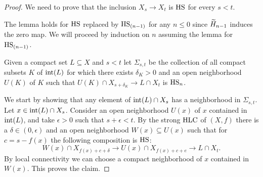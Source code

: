 \begin{proof}
	We need to prove that the inclusion $X_s \to X_t$ is $\mathrm{HS}$ for every $s < t$.
	
	The lemma holds for $\mathrm{HS}$ replaced by $\mathrm{HS}_{(n-1)}$ for any $n \leq 0$ since $\widetilde{H}_{n-1}$ induces the zero map. We will proceed by induction on $n$ assuming the lemma for $\mathrm{HS}_{(n-1)}$. 
	
	Given a compact set $L \subseteq X$ and $s < t$ let $\Sigma_{s, t}$ be the collection of all compact subsets $K$ of $\operatorname{int}(L)$ for which there exists $\delta_K > 0$ and an open neighborhood $U(K)$ of $K$ such that $U(K) \cap X_{s+\delta_K} \to L \cap X_{t}$ is $\mathrm{HS}_n$.
	
	We start by showing that any element of $\operatorname{int}(L) \cap X_s$ has a neighborhood in $\Sigma_{s, t}$.
	Let $x \in \operatorname{int}(L) \cap X_{s}$.
	Consider an open neighborhood $U(x)$ of $x$ contained in $\operatorname{int}(L)$, and take $\epsilon > 0$ such that $s + \epsilon < t$.
	By the strong $\mathrm{HLC}$ of $(X,f)$ there is a $\delta \in (0, \epsilon)$ and an open neighborhood $W(x) \subseteq U(x)$ such that for $c = s - f(x)$ the following composition is $\mathrm{HS}$:
	\begin{equation*}
	W(x) \cap X_{f(x) + c + \delta} \to
	U(x) \cap X_{f(x) + c + e} \to
	L \cap X_{t}.
	\end{equation*}
	By local connectivity we can choose a compact neighborhood of $x$ contained in $W(x)$.
	This proves the claim.
	

\end{proof}

